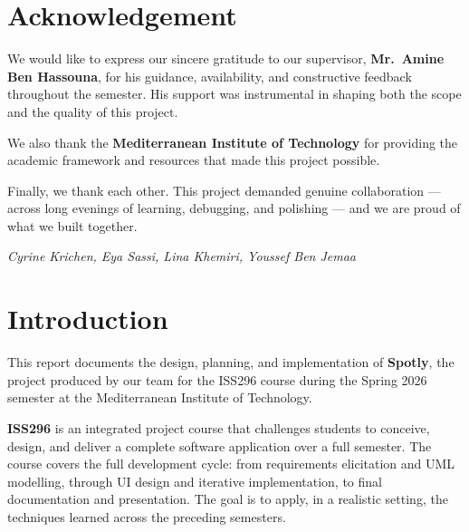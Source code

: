 \documentclass[12pt,a4paper,oneside]{report}
\begin{document}
\chapter*{Acknowledgement}

We would like to express our sincere gratitude to our supervisor,
\textbf{Mr.\ Amine Ben Hassouna}, for his guidance, availability, and
constructive feedback throughout the semester. His support was instrumental in
shaping both the scope and the quality of this project.

We also thank the \textbf{Mediterranean Institute of Technology} for providing
the academic framework and resources that made this project possible.

Finally, we thank each other. This project demanded genuine collaboration ---
across long evenings of learning, debugging, and polishing --- and we are proud
of what we built together.

\vspace{2em}
\noindent\textit{Cyrine Krichen, Eya Sassi, Lina Khemiri, Youssef Ben Jemaa}

\clearpage
\tableofcontents

\listoffigures

\clearpage
{}
\setcounter{page}{1}

\chapter*{Introduction}

This report documents the design, planning, and implementation of
\textbf{Spotly}, the project produced by our team for the ISS296 course
during the Spring 2026 semester at the Mediterranean Institute of Technology.

\textbf{ISS296} is an integrated project course that challenges students to
conceive, design, and deliver a complete software application over a full
semester. The course covers the full development cycle: from requirements
elicitation and UML modelling, through UI design and iterative implementation,
to final documentation and presentation. The goal is to apply, in a realistic
setting, the techniques learned across the preceding semesters.
\end{document}
